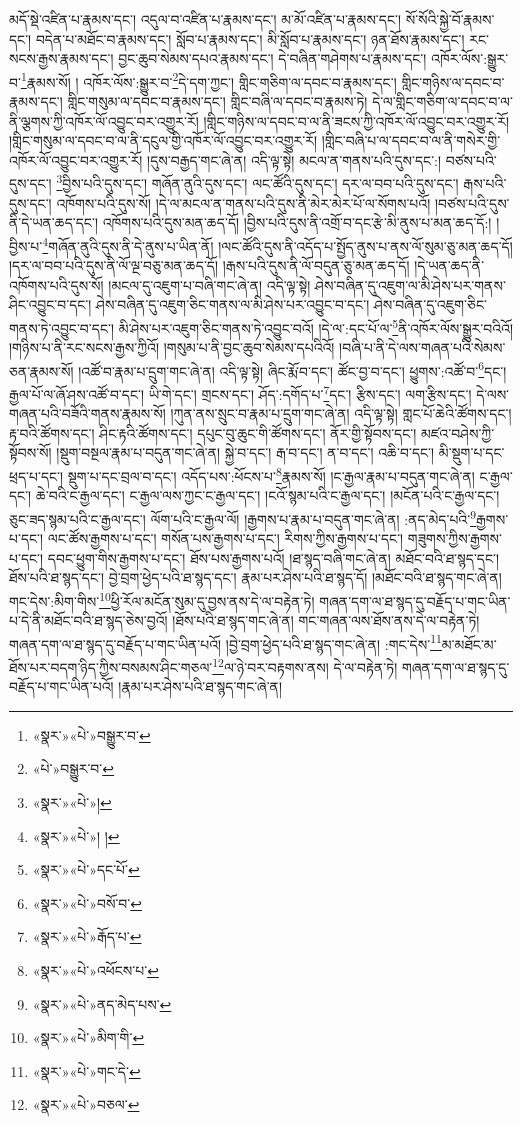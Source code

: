 མདོ་སྡེ་འཛིན་པ་རྣམས་དང་། འདུལ་བ་འཛིན་པ་རྣམས་དང་། མ་མོ་འཛིན་པ་རྣམས་དང་། སོ་སོའི་སྐྱེ་བོ་རྣམས་དང་། བདེན་པ་མཐོང་བ་རྣམས་དང་། སློབ་པ་རྣམས་དང་། མི་སློབ་པ་རྣམས་དང་། ཉན་ཐོས་རྣམས་དང་། རང་སངས་རྒྱས་རྣམས་དང་། བྱང་ཆུབ་སེམས་དཔའ་རྣམས་དང་། དེ་བཞིན་གཤེགས་པ་རྣམས་དང་། འཁོར་ལོས་:སྒྱུར་བ་\footnote{«སྣར་»«པེ་»བསྒྱུར་བ་}རྣམས་སོ། །
འཁོར་ལོས་:སྒྱུར་བ་\footnote{«པེ་»བསྒྱུར་བ་}དེ་དག་ཀྱང་། གླིང་གཅིག་ལ་དབང་བ་རྣམས་དང་། གླིང་གཉིས་ལ་དབང་བ་རྣམས་དང་། གླིང་གསུམ་ལ་དབང་བ་རྣམས་དང་། གླིང་བཞི་ལ་དབང་བ་རྣམས་ཏེ། དེ་ལ་གླིང་གཅིག་ལ་དབང་བ་ལ་ནི་ལྕགས་ཀྱི་འཁོར་ལོ་འབྱུང་བར་འགྱུར་རོ། །གླིང་གཉིས་ལ་དབང་བ་ལ་ནི་ཟངས་ཀྱི་འཁོར་ལོ་འབྱུང་བར་འགྱུར་རོ། །གླིང་གསུམ་ལ་དབང་བ་ལ་ནི་དངུལ་གྱི་འཁོར་ལོ་འབྱུང་བར་འགྱུར་རོ། །གླིང་བཞི་པ་ལ་དབང་བ་ལ་ནི་གསེར་གྱི་འཁོར་ལོ་འབྱུང་བར་འགྱུར་རོ། །དུས་བརྒྱད་གང་ཞེ་ན། འདི་ལྟ་སྟེ། མངལ་ན་གནས་པའི་དུས་དང་:། བཙས་པའི་དུས་དང་། \footnote{«སྣར་»«པེ་»།  }བྱིས་པའི་དུས་དང་། གཞོན་ནུའི་དུས་དང་། ལང་ཚོའི་དུས་དང་། དར་ལ་བབ་པའི་དུས་དང་། རྒས་པའི་དུས་དང་། འཁོགས་པའི་དུས་སོ། །དེ་ལ་མངལ་ན་གནས་པའི་དུས་ནི་མེར་མེར་པོ་ལ་སོགས་པའོ། །བཙས་པའི་དུས་ནི་དེ་ཡན་ཆད་དང་། འཁོགས་པའི་དུས་མན་ཆད་དོ། །བྱིས་པའི་དུས་ནི་འགྲོ་བ་དང་རྩེ་མི་ནུས་པ་མན་ཆད་དོ:། །བྱིས་པ་\footnote{«སྣར་»«པེ་»། །}གཞོན་ནུའི་དུས་ནི་དེ་ནུས་པ་ཡིན་ནོ། །ལང་ཚོའི་དུས་ནི་འདོད་པ་སྤྱོད་ནུས་པ་ནས་ལོ་སུམ་ཅུ་མན་ཆད་དོ། །དར་ལ་བབ་པའི་དུས་ནི་ལོ་ལྔ་བཅུ་མན་ཆད་དོ། །རྒས་པའི་དུས་ནི་ལོ་བདུན་ཅུ་མན་ཆད་དོ། །དེ་ཡན་ཆད་ནི་འཁོགས་པའི་དུས་སོ། །མངལ་དུ་འཇུག་པ་བཞི་གང་ཞེ་ན། འདི་ལྟ་སྟེ། ཤེས་བཞིན་དུ་འཇུག་ལ་མི་ཤེས་པར་གནས་ཤིང་འབྱུང་བ་དང་། ཤེས་བཞིན་དུ་འཇུག་ཅིང་གནས་ལ་མི་ཤེས་པར་འབྱུང་བ་དང་། ཤེས་བཞིན་དུ་འཇུག་ཅིང་གནས་ཏེ་འབྱུང་བ་དང་། མི་ཤེས་པར་འཇུག་ཅིང་གནས་ཏེ་འབྱུང་བའོ། །དེ་ལ་:དང་པོ་ལ་\footnote{«སྣར་»«པེ་»དང་པོ་}ནི་འཁོར་ལོས་སྒྱུར་བའིའོ། །གཉིས་པ་ནི་རང་སངས་རྒྱས་ཀྱིའོ། །གསུམ་པ་ནི་བྱང་ཆུབ་སེམས་དཔའིའོ། །བཞི་པ་ནི་དེ་ལས་གཞན་པའི་སེམས་ཅན་རྣམས་སོ། །འཚོ་བ་རྣམ་པ་དྲུག་གང་ཞེ་ན། འདི་ལྟ་སྟེ། ཞིང་རྨོ་བ་དང་། ཚོང་བྱ་བ་དང་། ཕྱུགས་:འཚོ་བ་\footnote{«སྣར་»«པེ་»བསོ་བ་}དང་། རྒྱལ་པོ་ལ་ཞོ་ཤས་འཚོ་བ་དང་། ཡི་གེ་དང་། གྲངས་དང་། ཤོད་:དགོད་པ་\footnote{«སྣར་»«པེ་»རྒོད་པ་}དང་། རྩིས་དང་། ལག་རྩིས་དང་། དེ་ལས་གཞན་པའི་བཟོའི་གནས་རྣམས་སོ། །ཀུན་ནས་སྲུང་བ་རྣམ་པ་དྲུག་གང་ཞེ་ན། འདི་ལྟ་སྟེ། གླང་པོ་ཆེའི་ཚོགས་དང་། རྟ་བའི་ཚོགས་དང་། ཤིང་རྟའི་ཚོགས་དང་། དཔུང་བུ་ཆུང་གི་ཚོགས་དང་། ནོར་གྱི་སྟོབས་དང་། མཛའ་བཤེས་ཀྱི་སྟོབས་སོ། །སྡུག་བསྔལ་རྣམ་པ་བདུན་གང་ཞེ་ན། སྐྱེ་བ་དང་། རྒ་བ་དང་། ན་བ་དང་། འཆི་བ་དང་། མི་སྡུག་པ་དང་ཕྲད་པ་དང་། སྡུག་པ་དང་བྲལ་བ་དང་། འདོད་པས་:ཕོངས་པ་\footnote{«སྣར་»«པེ་»འཕོངས་པ་}རྣམས་སོ། །ང་རྒྱལ་རྣམ་པ་བདུན་གང་ཞེ་ན། ང་རྒྱལ་དང་། ཆེ་བའི་ང་རྒྱལ་དང་། ང་རྒྱལ་ལས་ཀྱང་ང་རྒྱལ་དང་། །ངའོ་སྙམ་པའི་ང་རྒྱལ་དང་། །མངོན་པའི་ང་རྒྱལ་དང་། ཅུང་ཟད་སྙམ་པའི་ང་རྒྱལ་དང་། ལོག་པའི་ང་རྒྱལ་ལོ། །རྒྱགས་པ་རྣམ་པ་བདུན་གང་ཞེ་ན། :ནད་མེད་པའི་\footnote{«སྣར་»«པེ་»ནད་མེད་པས་}རྒྱགས་པ་དང་། ལང་ཚོས་རྒྱགས་པ་དང་། གསོན་པས་རྒྱགས་པ་དང་། རིགས་ཀྱིས་རྒྱགས་པ་དང་། གཟུགས་ཀྱིས་རྒྱགས་པ་དང་། དབང་ཕྱུག་གིས་རྒྱགས་པ་དང་། ཐོས་པས་རྒྱགས་པའོ། །ཐ་སྙད་བཞི་གང་ཞེ་ན། མཐོང་བའི་ཐ་སྙད་དང་། ཐོས་པའི་ཐ་སྙད་དང་། བྱེ་བྲག་ཕྱེད་པའི་ཐ་སྙད་དང་། རྣམ་པར་ཤེས་པའི་ཐ་སྙད་དོ། །མཐོང་བའི་ཐ་སྙད་གང་ཞེ་ན། གང་དེས་:མིག་གིས་\footnote{«སྣར་»«པེ་»མིག་གི་}ཕྱི་རོལ་མངོན་སུམ་དུ་བྱས་ནས་དེ་ལ་བརྟེན་ཏེ། གཞན་དག་ལ་ཐ་སྙད་དུ་བརྗོད་པ་གང་ཡིན་པ་དེ་ནི་མཐོང་བའི་ཐ་སྙད་ཅེས་བྱའོ། །ཐོས་པའི་ཐ་སྙད་གང་ཞེ་ན། གང་གཞན་ལས་ཐོས་ནས་དེ་ལ་བརྟེན་ཏེ། གཞན་དག་ལ་ཐ་སྙད་དུ་བརྗོད་པ་གང་ཡིན་པའོ། །བྱེ་བྲག་ཕྱེད་པའི་ཐ་སྙད་གང་ཞེ་ན། :གང་དེས་\footnote{«སྣར་»«པེ་»གང་དེ་}མ་མཐོང་མ་ཐོས་པར་བདག་ཉིད་ཀྱིས་བསམས་ཤིང་གཅལ་\footnote{«སྣར་»«པེ་»བཅལ་}ལ་ཉེ་བར་བརྟགས་ནས། དེ་ལ་བརྟེན་ཏེ། གཞན་དག་ལ་ཐ་སྙད་དུ་བརྗོད་པ་གང་ཡིན་པའོ། །རྣམ་པར་ཤེས་པའི་ཐ་སྙད་གང་ཞེ་ན། 